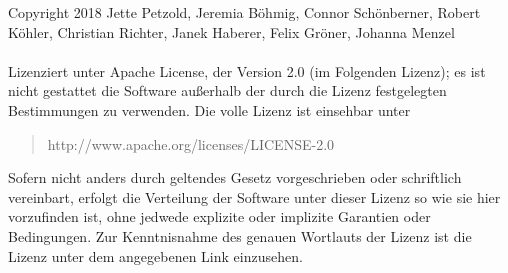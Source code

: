 Copyright 2018 Jette Petzold, Jeremia B\"{o}hmig, Connor Sch\"{o}nberner, Robert K\"{o}hler, Christian Richter, Janek Haberer, Felix Gr\"{o}ner, Johanna Menzel\\
\\Lizenziert unter Apache License, der Version 2.0 (im Folgenden Lizenz); es ist nicht gestattet die Software au\ss{}erhalb der durch die Lizenz festgelegten Bestimmungen zu verwenden.
Die volle Lizenz ist einsehbar unter
\begin{quote}
	http://www.apache.org/licenses/LICENSE-2.0
\end{quote}
Sofern nicht anders durch geltendes Gesetz vorgeschrieben oder schriftlich vereinbart, erfolgt die Verteilung der Software unter dieser Lizenz so wie sie hier vorzufinden ist, ohne jedwede explizite oder implizite Garantien oder Bedingungen.
Zur Kenntnisnahme des genauen Wortlauts der Lizenz ist die Lizenz unter dem angegebenen Link einzusehen.

